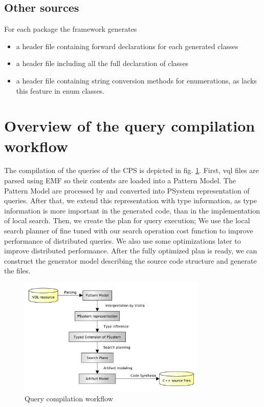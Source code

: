 \subsection{ Other sources }

For each package the framework generates
\begin{itemize}
	\item a header file containing forward declarations for each generated classes
	\item a header file including all the full declaration of classes
	\item a header file containing string conversion methods for enumerations, as \cpp{} lacks this feature in enum classes.
\end{itemize} 



		\section{Overview of the query compilation workflow}



The compilation of the queries of the CPS is depicted in fig. \ref{figure:query-compile-workflow}. 
First, vql files are parsed using EMF so their contents are loaded into a Pattern Model.
The Pattern Model are processed by \viatra{} and converted into PSystem representation of queries.
After that, we extend this representation with type information, as type information is more important in the \cpp{} generated code, than in the \viatra implementation of local search.
Then, we create the plan for query execution; We use the local search planner of \viatra{} fine tuned with our search operation cost function to improve performance of distributed queries. 
We also use some optimizations later to improve distributed performance. 
After the fully optimized plan is ready, we can construct the generator model describing the source code structure and generate the \cpp{} files.


\begin{figure}[h]
	\begin{center}
		\includegraphics[width=0.8\textwidth]{figures/query-compilation-workflow.pdf}
		\caption{Query compilation workflow}
		\label{figure:query-compile-workflow}
	\end{center}
\end{figure}



